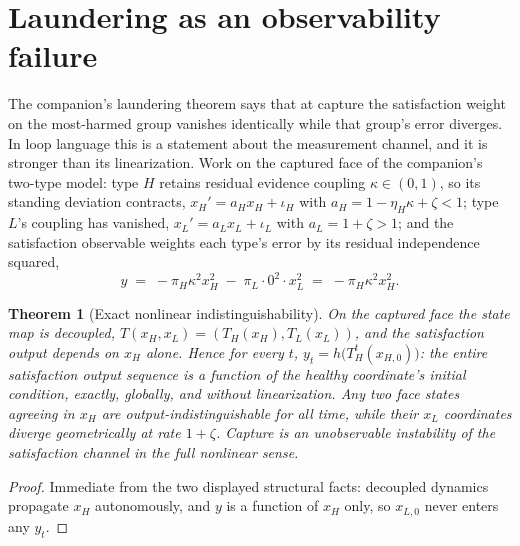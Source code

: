 \documentclass[11pt]{article}
\newtheorem{theorem}{Theorem}[section]
\theoremstyle{definition}
\theoremstyle{remark}
\numberwithin{equation}{section}
\begin{document}
\section{Laundering as an observability failure}\label{sec:obs}

The companion's laundering theorem says that at capture the satisfaction weight on the most-harmed group vanishes identically while that group's error diverges. In loop language this is a statement about the measurement channel, and it is stronger than its linearization. Work on the captured face of the companion's two-type model: type $H$ retains residual evidence coupling $\kappa\in(0,1)$, so its standing deviation contracts, $x_H'=a_Hx_H+\iota_H$ with $a_H=1-\eta_H\kappa+\zeta<1$; type $L$'s coupling has vanished, $x_L'=a_Lx_L+\iota_L$ with $a_L=1+\zeta>1$; and the satisfaction observable weights each type's error by its residual independence squared,
\[
y \;=\; -\pi_H\kappa^2x_H^2 \;-\; \pi_L\cdot 0^2\cdot x_L^2 \;=\; -\pi_H\kappa^2x_H^2 .
\]

\begin{theorem}[Exact nonlinear indistinguishability]\label{thm:exact}
On the captured face the state map is decoupled, $T(x_H,x_L)=(T_H(x_H),T_L(x_L))$, and the satisfaction output depends on $x_H$ alone. Hence for every $t$, $y_t=h\bigl(T_H^t(x_{H,0})\bigr)$: the entire satisfaction output sequence is a function of the healthy coordinate's initial condition, exactly, globally, and without linearization. Any two face states agreeing in $x_H$ are output-indistinguishable for all time, while their $x_L$ coordinates diverge geometrically at rate $1+\zeta$. Capture is an unobservable instability of the satisfaction channel in the full nonlinear sense.
\end{theorem}

\begin{proof}
Immediate from the two displayed structural facts: decoupled dynamics propagate $x_H$ autonomously, and $y$ is a function of $x_H$ only, so $x_{L,0}$ never enters any $y_t$.
\end{proof}
\end{document}
